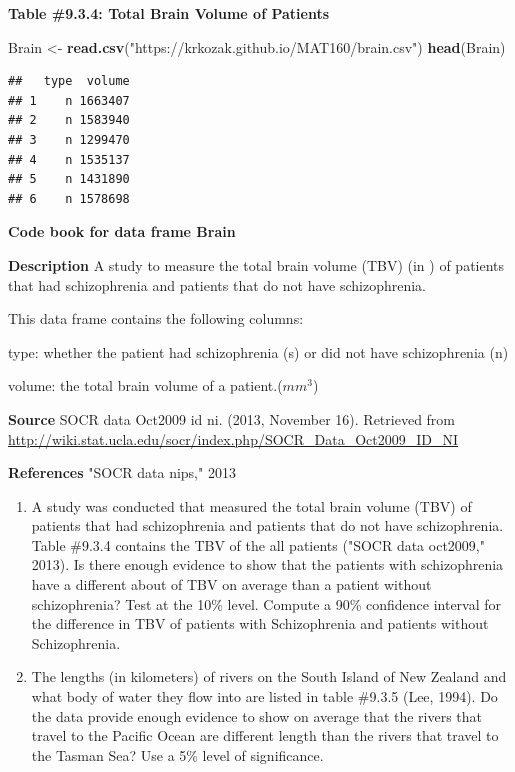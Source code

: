 \documentclass[]{book}
\newenvironment{Shaded}{\begin{snugshade}}{\end{snugshade}}
\newcommand{\KeywordTok}[1]{\textcolor[rgb]{0.13,0.29,0.53}{\textbf{#1}}}
\newcommand{\NormalTok}[1]{#1}
\newcommand{\StringTok}[1]{\textcolor[rgb]{0.31,0.60,0.02}{#1}}
\begin{document}
\textbf{Table \#9.3.4: Total Brain Volume of Patients}

\begin{Shaded}
\begin{Highlighting}[]
\NormalTok{Brain <-}\StringTok{ }\KeywordTok{read.csv}\NormalTok{(}\StringTok{"https://krkozak.github.io/MAT160/brain.csv"}\NormalTok{)}
\KeywordTok{head}\NormalTok{(Brain)}
\end{Highlighting}
\end{Shaded}

\begin{verbatim}
##   type  volume
## 1    n 1663407
## 2    n 1583940
## 3    n 1299470
## 4    n 1535137
## 5    n 1431890
## 6    n 1578698
\end{verbatim}

\textbf{Code book for data frame Brain}

\textbf{Description}
A study to measure the total brain volume (TBV) (in ) of patients that had schizophrenia and patients that do not have schizophrenia.

This data frame contains the following columns:

type: whether the patient had schizophrenia (s) or did not have schizophrenia (n)

volume: the total brain volume of a patient.(\(mm^3\))

\textbf{Source}
SOCR data Oct2009 id ni. (2013, November 16). Retrieved from
\url{http://wiki.stat.ucla.edu/socr/index.php/SOCR_Data_Oct2009_ID_NI}

\textbf{References}
"SOCR data nips," 2013

\begin{enumerate}
\def\labelenumi{\arabic{enumi}.}
\setcounter{enumi}{3}
\item
  A study was conducted that measured the total brain volume (TBV) of patients that had schizophrenia and patients that do not have schizophrenia. Table \#9.3.4 contains the TBV of the all patients ("SOCR data oct2009," 2013). Is there enough evidence to show that the patients with schizophrenia have a different about of TBV on average than a patient without schizophrenia? Test at the 10\% level. Compute a 90\% confidence interval for the difference in TBV of patients with Schizophrenia and patients without Schizophrenia.
\item
  The lengths (in kilometers) of rivers on the South Island of New Zealand and what body of water they flow into are listed in table \#9.3.5 (Lee, 1994). Do the data provide enough evidence to show on average that the rivers that travel to the Pacific Ocean are different length than the rivers that travel to the Tasman Sea? Use a 5\% level of significance.
\end{enumerate}
\end{document}
